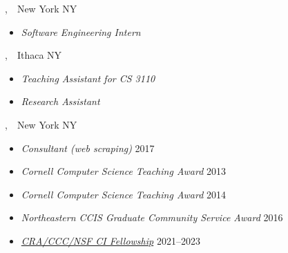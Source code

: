 \documentclass{article}
\begin{document}

,~~New York NY
\begin{itemize}
  \item \emph{Software Engineering Intern} \hfill {}
\end{itemize}

,~~Ithaca NY
\begin{itemize}
  \item \emph{Teaching Assistant for CS 3110} \hfill {}
  \item \emph{Research Assistant} \hfill {}
\end{itemize}

,~~New York NY
\begin{itemize}
  \item \emph{Consultant (web scraping)} \hfill 2017
\end{itemize}


\newpage
{} %
\begin{itemize}
  \item \emph{Cornell Computer Science Teaching Award} \hfill 2013
  \item \emph{Cornell Computer Science Teaching Award} \hfill 2014
  \item \emph{Northeastern CCIS Graduate Community Service Award} \hfill 2016
  \item \href{https://cifellows2020.org}{\emph{CRA/CCC/NSF CI Fellowship}} \hfill 2021--2023
\end{itemize}
\end{document}
